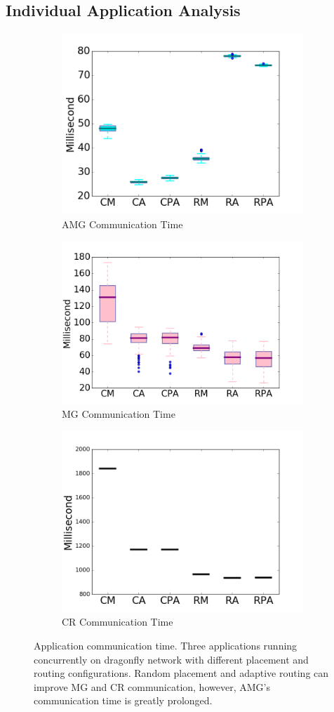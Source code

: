 \documentclass[conference,compsoc]{IEEEtran}
\begin{document}
\subsection{Individual Application Analysis}
\label{sec: workload-1 app analysis}

\begin{figure}[t!]
    \centering
    \begin{subfigure}[t]{0.32\textwidth}
        \centering
        \includegraphics[height=1.5 in]{wkld/amg/commtime}
        \caption{AMG Communication Time}
        \label{fig:amg-commtime}
    \end{subfigure}%
    \hspace{1em}%
    \begin{subfigure}[t]{0.32\textwidth}
        \centering
        \includegraphics[height=1.5 in]{wkld/mg/commtime}
        \caption{MG Communication Time}
        \label{fig:mg-commtime}
    \end{subfigure}%
    \begin{subfigure}[t]{0.32\textwidth}
        \centering
        \includegraphics[height=1.5 in]{wkld/cr/commtime}
        \caption{CR Communication Time}
        \label{fig:cr-commtime}
    \end{subfigure}%
   \caption{Application communication time. Three applications running concurrently on dragonfly network with different placement and routing configurations. Random placement and adaptive routing can improve MG and CR communication, however, AMG's communication time is greatly prolonged.}
   \label{fig:apps-commtime}
\end{figure}
\end{document}
